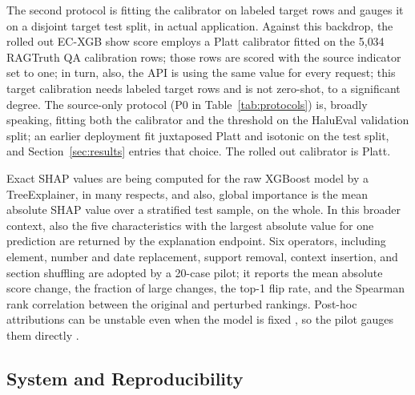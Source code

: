 \documentclass[a4paper,fleqn]{cas-sc}
\begin{document}
The second protocol is fitting the calibrator on labeled target rows and gauges it on a disjoint target test split, in actual application. Against this backdrop, the rolled out EC-XGB show score employs a Platt calibrator fitted on the 5{,}034 RAGTruth QA calibration rows; those rows are scored with the source indicator set to one; in turn, also, the API is using the same value for every request; this target calibration needs labeled target rows and is not zero-shot, to a significant degree. The source-only protocol (P0 in Table~\ref{tab:protocols}) is, broadly speaking, fitting both the calibrator and the threshold on the HaluEval validation split; an earlier deployment fit juxtaposed Platt and isotonic on the test split, and Section~\ref{sec:results} entries that choice. The rolled out calibrator is Platt.

Exact SHAP values \cite{shap} are being computed for the raw XGBoost model by a TreeExplainer, in many respects, and also, global importance is the mean absolute SHAP value over a stratified test sample, on the whole. In this broader context, also the five characteristics with the largest absolute value for one prediction are returned by the explanation endpoint. Six operators, including element, number and date replacement, support removal, context insertion, and section shuffling are adopted by a 20-case pilot; it reports the mean absolute score change, the fraction of large changes, the top-1 flip rate, and the Spearman rank correlation between the original and perturbed rankings. Post-hoc attributions can be unstable even when the model is fixed \cite{kelodjou2024shap}, so the pilot gauges them directly \cite{adebayo2018}.

\subsection{System and Reproducibility}
\end{document}
